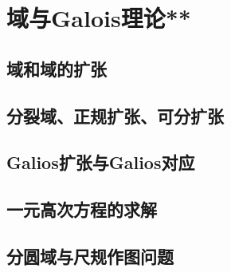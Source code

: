 
\section{域与Galois理论**}
\clearpage
\subsection{域和域的扩张}
\clearpage
\subsection{分裂域、正规扩张、可分扩张}
\clearpage
\subsection{Galios扩张与Galios对应}
\clearpage
\subsection{一元高次方程的求解}
\clearpage
\subsection{分圆域与尺规作图问题}